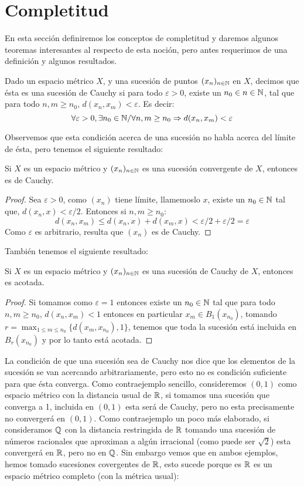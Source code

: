 \documentclass[12pt,a4paper]{book}
\begin{document}
\else
\fi
\section{Completitud}
En esta sección definiremos los conceptos de completitud y daremos algunos teoremas interesantes al respecto de esta noción, pero antes requerimos de una definición y algunos resultados.
\begin{defi}
Dado un espacio métrico $X$, y una sucesión de puntos $(x_n)_{{n} \in \mathbb{N}}$ en $X$, decimos que ésta es una sucesión de Cauchy si para todo $\varepsilon>0$, existe un $n_0 \in {{n} \in \mathbb{N}}$, tal que para todo $n,m \geq n_0$, $d(x_n,x_m)<\varepsilon$. Es decir:
$$ \forall \varepsilon > 0, \exists n_0 \in \mathbb{N} \slash \forall n,m \geq n_0 \Rightarrow d(x_n,x_m) < \varepsilon $$
\end{defi}
Observemos que esta condición acerca de una sucesión no habla acerca del límite de ésta, pero tenemos el siguiente resultado:
\begin{prop}
Si $X$ es un espacio métrico y $(x_n)_{{n} \in \mathbb{N}}$ es una sucesión convergente de $X$, entonces es de Cauchy.
\begin{proof}
Sea $\varepsilon>0$, como $(x_n)$ tiene límite, llamemoslo $x$, existe un $n_0 \in \mathbb{N}$ tal que, $d(x_n,x)< \varepsilon/2$. Entonces si $n,m \geq n_0$:
$$ d(x_n,x_m) \leq d(x_n,x) + d(x_m,x) < \varepsilon/2 + \varepsilon/2 = \varepsilon$$
Como $\varepsilon$ es arbitrario, resulta que $(x_n)$ es de Cauchy.
\end{proof}
\end{prop}
También tenemos el siguiente resultado:
\begin{prop}
Si $X$ es un espacio métrico y $(x_n)_{{n} \in \mathbb{N}}$ es una sucesión de Cauchy de $X$, entonces es acotada.
\begin{proof}
Si tomamos como $\varepsilon = 1$ entonces existe un $n_0 \in \mathbb{N}$ tal que para todo $n,m \geq n_0$, $d(x_n,x_m)< 1$ entonces en particular $x_m \in B_1(x_{n_0})$, tomando $r = \max_{1 \leq m \leq n_0} \{ d(x_m,x_{n_0}) , 1 \}$, tenemos que toda la sucesión está incluida en $B_r(x_{n_0})$ y por lo tanto está acotada.
\end{proof}
\end{prop}
La condición de que una sucesión sea de Cauchy nos dice que los elementos de la sucesión se van acercando arbitrariamente, pero esto no es condición suficiente para que ésta converga. Como contraejemplo sencillo, consideremos $(0,1)$ como espacio métrico con la distancia usual de $\mathbb{R}$, si tomamos una sucesión que converga a 1, incluida en $(0,1)$ esta será de Cauchy, pero no esta precisamente no convergerá en $(0,1)$. Como contraejemplo un poco más elaborado, si consideramos $\mathbb{Q}$ con la distancia restringida de $\mathbb{R}$ tomando una sucesión de números racionales que aproximan a algún irracional (como puede ser $\sqrt{2}$) esta convergerá en $\mathbb{R}$, pero no en $\mathbb{Q}$. Sin embargo vemos que en ambos ejemplos, hemos tomado sucesiones covergentes de $\mathbb{R}$, esto sucede porque es $\mathbb{R}$ es un espacio métrico completo (con la métrica usual):
\end{document}
